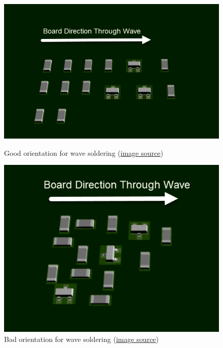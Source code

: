\documentclass[final]{cubedoc}
\begin{document}
\begin{itemize}
		\begin{figure}[h!]
			\centering
			\begin{minipage}[b]{0.4\textwidth}
				\includegraphics[width=\textwidth]{assets/good_wave.png}
				\caption{Good orientation for wave soldering \small{(\href{https://web.archive.org/web/20200814195553/https://www.autodesk.com/products/eagle/blog/top-10-pcb-component-placement-tips-pcb-beginner/}{image source}})}
			\end{minipage}
			\hfill
			\begin{minipage}[b]{0.4\textwidth}
				\includegraphics[width=\textwidth]{assets/bad_wave.png}
				\caption{Bad orientation for wave soldering \small{(\href{https://web.archive.org/web/20200814195553/https://www.autodesk.com/products/eagle/blog/top-10-pcb-component-placement-tips-pcb-beginner/}{image source}})}
			\end{minipage}
		\end{figure}
		

\end{itemize}
\end{document}

